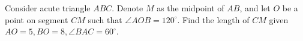 Consider acute triangle $ABC$. Denote $M$ as the midpoint of $AB$, and let $O$ be a point on segment $CM$ such that $\angle{AOB}=120^{\circ}$. Find the length of $CM$ given $AO=5, BO=8, \angle{BAC}=60^{\circ}$.
